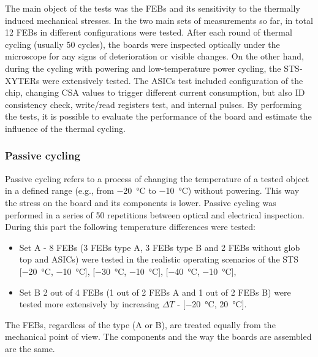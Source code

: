 The main object of the tests was the \gls{FEB}s and its sensitivity to the thermally induced mechanical stresses. In the two main sets of measurements so far, in total 12 \gls{FEB}s in different configurations were tested.  After each round of thermal cycling (usually 50 cycles), the boards were inspected optically under the microscope for any signs of deterioration or visible changes. On the other hand, during the cycling with powering and low-temperature power cycling, the STS-XYTERs were extensively tested. The \glspl{ASIC} test included configuration of the chip, changing \gls{CSA} values to trigger different current consumption, but also ID consistency check, write/read registers test, and internal pulses. By performing the tests, it is possible to evaluate the performance of the board and estimate the influence of the thermal cycling.

\subsubsection{Passive cycling}
Passive cycling refers to a process of changing the temperature of a tested object in a defined range (e.g., from \SI{-20}{\celsius} to \SI{-10}{\celsius}) without powering. This way the stress on the board and its components is lower. Passive cycling was performed in a series of 50 repetitions between optical and electrical inspection. During this part the following temperature differences were tested:
\begin{itemize}
    \item Set A - 8 \glspl{FEB} (3 \glspl{FEB} type A, 3 \glspl{FEB} type B and 2 \glspl{FEB} without glob top and \glspl{ASIC}) were tested in the realistic operating scenarios of the \gls{STS} [\SI{-20}{\celsius}, \SI{-10}{\celsius}], [\SI{-30}{\celsius}, \SI{-10}{\celsius}], [\SI{-40}{\celsius}, \SI{-10}{\celsius}],
    \item Set B 2 out of 4 \glspl{FEB} (1 out of 2 \glspl{FEB} A and 1 out of 2 \glspl{FEB} B) were tested more extensively by increasing $\Delta T$ - [\SI{-20}{\celsius}, \SI{20}{\celsius}].
\end{itemize}
The \glspl{FEB}, regardless of the type (A or B), are treated equally from the mechanical point of view. The components and the way the boards are assembled are the same.


